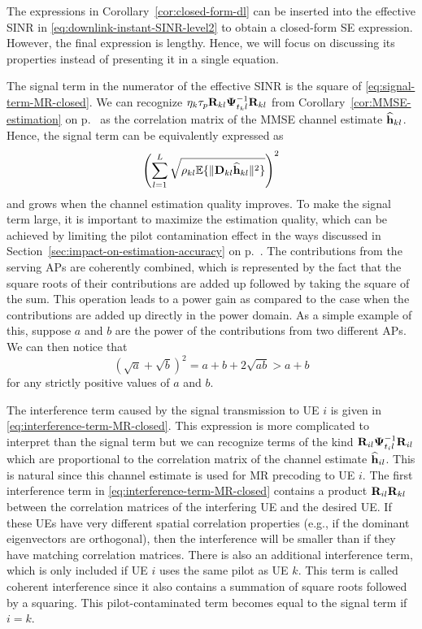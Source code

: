 The expressions in Corollary~\ref{cor:closed-form-dl} can be inserted into the effective SINR in \eqref{eq:downlink-instant-SINR-level2} to obtain a closed-form SE expression. However, the final expression is lengthy. Hence, we will focus on discussing its properties instead of presenting it in a single equation.

The signal term in the numerator of the effective SINR is the square of \eqref{eq:signal-term-MR-closed}. We can recognize $\eta_k \tau_p \mathbf{R}_{kl} \mathbf{\Psi}_{t_k l}^{-1} \mathbf{R}_{kl}$ from Corollary~\ref{cor:MMSE-estimation} on p.~\pageref{cor:MMSE-estimation} as the correlation matrix of the MMSE channel estimate $\widehat{\mathbf{h}}_{kl}$. Hence, the signal term can be equivalently expressed as
\begin{equation}
\left(\sum_{l=1}^{L}  \sqrt{\rho_{kl} \mathbb{E}\{ \| \mathbf{D}_{kl} \widehat{\mathbf{h}}_{kl} \|^2 \} }\right)^2
\end{equation}
and grows when the channel estimation quality improves. To make the signal term large, it is important to maximize the estimation quality, which can be achieved by limiting the pilot contamination effect in the ways discussed in Section~\ref{sec:impact-on-estimation-accuracy} on p.~\pageref{sec:impact-on-estimation-accuracy}. The contributions from the serving APs are coherently combined, which is represented by the fact that the square roots of their contributions are added up followed by taking the square of the sum. This operation leads to a power gain as compared to the case when the contributions are added up directly in the power domain. As a simple example of this, suppose $a$ and $b$ are the power of the contributions from two different APs. We can then notice that
\begin{equation}
(\sqrt{a}+\sqrt{b})^2 = a+b+2\sqrt{ab} > a+b
\end{equation}
for any strictly positive values of $a$ and $b$.

The interference term caused by the signal transmission to UE $i$ is given in \eqref{eq:interference-term-MR-closed}. This expression is more complicated to interpret than the signal term but we can recognize terms of the kind $ \mathbf{R}_{il} \mathbf{\Psi}_{t_i l}^{-1} \mathbf{R}_{il}$ which are proportional to the correlation matrix of the channel estimate $\widehat{\mathbf{h}}_{il}$. This is natural since this channel estimate is used for MR precoding to UE $i$.
The first interference term in \eqref{eq:interference-term-MR-closed} contains a product $\mathbf{R}_{il} \mathbf{R}_{kl} $ between the correlation matrices of the interfering UE and the desired UE. If these UEs have very different spatial correlation properties (e.g., if the dominant eigenvectors are orthogonal), then the interference will be smaller than if they have matching correlation matrices. There is also an additional interference term, which is only included if UE $i$ uses the same pilot as UE $k$. This term is called coherent interference since it also contains a summation of square roots followed by a squaring. This pilot-contaminated term becomes equal to the signal term if $i=k$.

